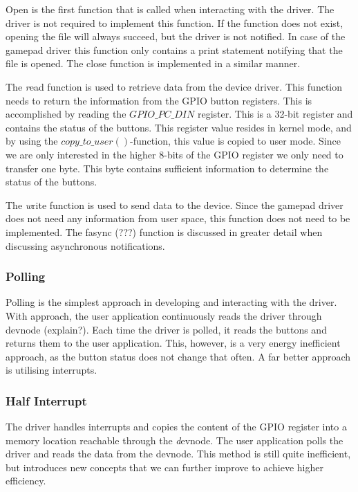 Open is the first function that is called when interacting with the driver. The driver is not required to implement this function. If the function does not exist, opening the file will always succeed, but the driver is not notified. In case of the gamepad driver this function only contains a print statement notifying that the file is opened. The close function is implemented in a similar manner. 

The \emph read function is used to retrieve data from the device driver. This function needs to return the information from the GPIO button registers. This is accomplished by reading the $GPIO\_PC\_DIN$ register. This is a 32-bit register and contains the status of the buttons. This register value resides in kernel mode, and by using the  $copy\_to\_user()$-function, this value is copied to user mode. Since we are only interested in the higher 8-bits of the GPIO register we only need to transfer one byte. This byte contains sufficient information to determine the status of the buttons. 

The \emph write function is used to send data to the device. Since the gamepad driver does not need any information from user space, this function does not need to be implemented. The fasync (???) function is discussed in greater detail when discussing asynchronous notifications. 




\subsubsection{Polling}
Polling is the simplest approach in developing and interacting with the driver. With approach, the user application continuously reads the driver through devnode (explain?). Each time the driver is polled, it reads the buttons and returns them to the user application. This, however, is a very energy inefficient approach, as the button status does not change that often. A far better approach is utilising interrupts. 


\subsubsection{Half Interrupt}
The driver handles interrupts and copies the content of the GPIO register into a memory location reachable through the {\emph devnode}. The user application polls the driver and reads the data from the devnode. This method is still quite inefficient, but introduces new concepts that we can further improve to achieve higher efficiency. 

